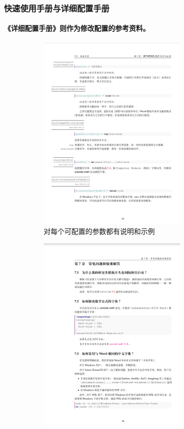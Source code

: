 \documentclass[
  aspectratio=169,
  presentation,
  titlegraphic=./images/bit.png,
  framelogo=./images/bit.png
]{bitbeamer}
\begin{document}
\begin{frame}
\frametitle{快速使用手册与详细配置手册}
\framesubtitle{《详细配置手册》则作为修改配置的参考资料。}

  \vspace{-4ex}
  
  \begin{figure}
    \begin{subfigure}{0.40\textwidth}
      \includegraphics[width=0.8\textwidth]{images/10-1.png}
      \caption{对每个可配置的参数都有说明和示例}
    \end{subfigure}
    \begin{subfigure}{0.40\textwidth}
      \includegraphics[width=0.8\textwidth]{images/10-2.png}

\end{subfigure}
\end{figure}
\end{frame}
\end{document}
